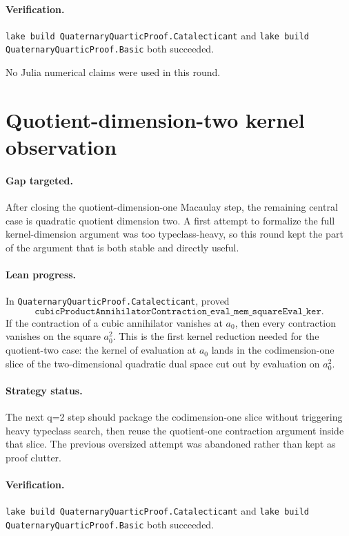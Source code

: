 \documentclass[11pt]{article}
\begin{document}
\paragraph{Verification.}
\texttt{lake build QuaternaryQuarticProof.Catalecticant} and
\texttt{lake build QuaternaryQuarticProof.Basic} both succeeded.

No Julia numerical claims were used in this round.

\section*{Quotient-dimension-two kernel observation}

\paragraph{Gap targeted.}
After closing the quotient-dimension-one Macaulay step, the remaining central
case is quadratic quotient dimension two.  A first attempt to formalize the
full kernel-dimension argument was too typeclass-heavy, so this round kept the
part of the argument that is both stable and directly useful.

\paragraph{Lean progress.}
In \texttt{QuaternaryQuarticProof.Catalecticant}, proved
\[
\texttt{cubicProductAnnihilatorContraction\_eval\_mem\_squareEval\_ker}.
\]
If the contraction of a cubic annihilator vanishes at \(a_0\), then every
contraction vanishes on the square \(a_0^2\).  This is the first kernel
reduction needed for the quotient-two case: the kernel of evaluation at
\(a_0\) lands in the codimension-one slice of the two-dimensional quadratic
dual space cut out by evaluation on \(a_0^2\).

\paragraph{Strategy status.}
The next q=2 step should package the codimension-one slice without triggering
heavy typeclass search, then reuse the quotient-one contraction argument
inside that slice.  The previous oversized attempt was abandoned rather than
kept as proof clutter.

\paragraph{Verification.}
\texttt{lake build QuaternaryQuarticProof.Catalecticant} and
\texttt{lake build QuaternaryQuarticProof.Basic} both succeeded.
\end{document}
